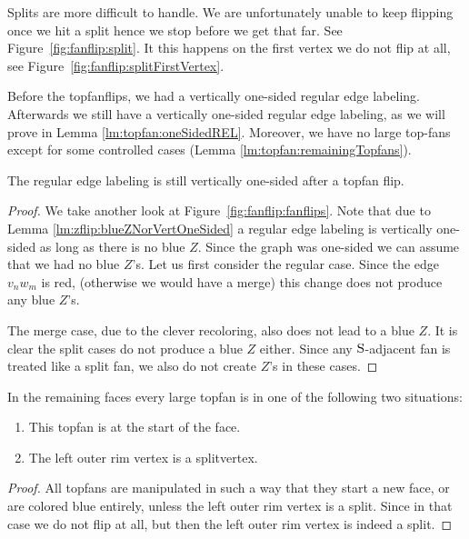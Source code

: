   Splits are more difficult to handle. We are unfortunately unable to keep flipping once we hit a split hence we stop before we get that far. See Figure~\ref{fig:fanflip:split}. It this happens on the first vertex we do not flip at all, see Figure~\ref{fig:fanflip:splitFirstVertex}.

  Before the topfanflips, we had a vertically one-sided regular edge labeling. Afterwards we still have a vertically one-sided regular edge labeling, as we will prove in Lemma \ref{lm:topfan:oneSidedREL}. Moreover, we have no large top-fans except for some controlled cases (Lemma \ref{lm:topfan:remainingTopfans}).

  \begin{lemma}
    \label{lm:topfan:oneSidedREL}
    The regular edge labeling is still vertically one-sided after a topfan flip.
  \end{lemma}
  \begin{proof}
    We take another look at Figure~\ref{fig:fanflip:fanflips}. Note that due to Lemma \ref{lm:zflip:blueZNorVertOneSided} a regular edge labeling is vertically one-sided as long as there is no blue $Z$.  Since the graph was one-sided we can assume that we had no blue $Z$'s.
    Let us first consider the regular case. Since the edge  $v_n w_m$ is red, (otherwise we would have a merge) this change does not produce any blue $Z$'s.

    The merge case, due to the clever recoloring, also does not lead to a blue $Z$.
    It is clear the split cases do not produce a blue $Z$ either.
    Since any $\mathrm{S}$-adjacent fan is treated like a split fan, we also do not create $Z$'s in these cases.
  \end{proof}
\pagebreak[2]

\begin{lemma}
  \label{lm:topfan:remainingTopfans}
  In the remaining faces every large topfan is in one of the following two situations:
  \begin{enumerate}
    \item  This topfan is at the start of the face.
    \item  The left outer rim vertex is a splitvertex.
  \end{enumerate}
\end{lemma}
\begin{proof}
  All topfans are manipulated in such a way that they start a new face, or are colored blue entirely, unless the left outer rim vertex is a split. Since in that case we do not flip at all, but then the left outer rim vertex is indeed a split.
\end{proof}

